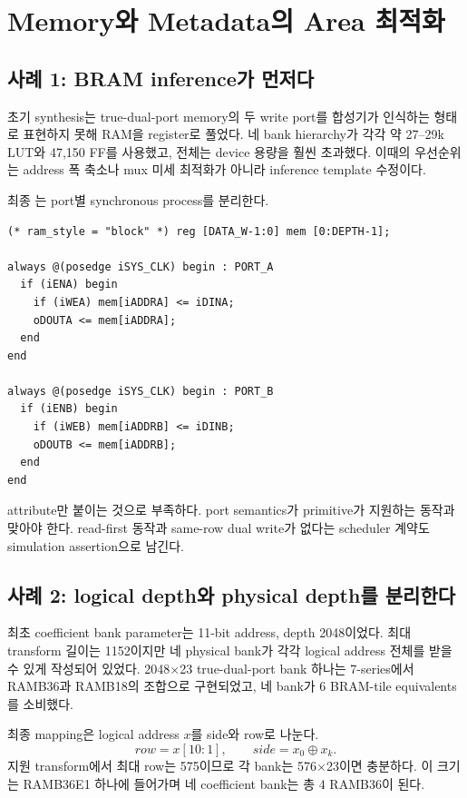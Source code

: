 \chapter{Memory와 Metadata의 Area 최적화}

\section{사례 1: BRAM inference가 먼저다}

초기 synthesis는 true-dual-port memory의 두 write port를 합성기가 인식하는
형태로 표현하지 못해 RAM을 register로 풀었다. 네 bank hierarchy가 각각 약
27--29k LUT와 47,150 FF를 사용했고, 전체는 device 용량을 훨씬 초과했다.
이때의 우선순위는 address 폭 축소나 mux 미세 최적화가 아니라 inference
template 수정이다.

최종 는 port별 synchronous process를 분리한다.

\begin{lstlisting}
(* ram_style = "block" *) reg [DATA_W-1:0] mem [0:DEPTH-1];

always @(posedge iSYS_CLK) begin : PORT_A
  if (iENA) begin
    if (iWEA) mem[iADDRA] <= iDINA;
    oDOUTA <= mem[iADDRA];
  end
end

always @(posedge iSYS_CLK) begin : PORT_B
  if (iENB) begin
    if (iWEB) mem[iADDRB] <= iDINB;
    oDOUTB <= mem[iADDRB];
  end
end
\end{lstlisting}

 attribute만 붙이는 것으로 부족하다. port semantics가
primitive가 지원하는 동작과 맞아야 한다. read-first 동작과 same-row dual write가
없다는 scheduler 계약도 simulation assertion으로 남긴다.

\section{사례 2: logical depth와 physical depth를 분리한다}

최초 coefficient bank parameter는 11-bit address, depth 2048이었다. 최대 transform
길이는 1152이지만 네 physical bank가 각각 logical address 전체를 받을 수 있게
작성되어 있었다. 2048$\times$23 true-dual-port bank 하나는 7-series에서
RAMB36과 RAMB18의 조합으로 구현되었고, 네 bank가 6 BRAM-tile equivalents를
소비했다.

최종 mapping은 logical address $x$를 side와 row로 나눈다.
\[
row=x[10:1],\qquad side=x_0\oplus x_k.
\]
지원 transform에서 최대 row는 575이므로 각 bank는 576$\times$23이면 충분하다.
이 크기는 RAMB36E1 하나에 들어가며 네 coefficient bank는 총 4 RAMB36이 된다.


